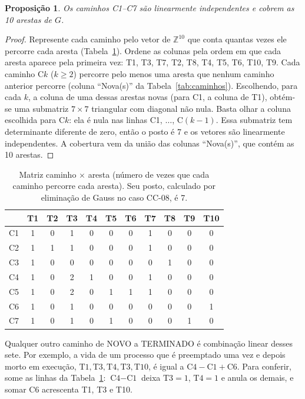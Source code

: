 \documentclass[11pt,a4paper]{article}
\newtheorem{proposicao}{Proposição}
\theoremstyle{definition}
\newcommand{\est}[1]{\textsf{\small #1}}   %
\begin{document}
\begin{proposicao}\label{prop:base}
Os caminhos C1--C7 são linearmente independentes e cobrem as 10 arestas de $G$.
\end{proposicao}
\begin{proof}
Represente cada caminho pelo vetor de $\mathbb{Z}^{10}$ que conta quantas vezes ele percorre cada
aresta (Tabela~\ref{tab:matriz-caminhos}). Ordene as colunas pela ordem em que cada aresta aparece
pela primeira vez: T1, T3, T7, T2, T8, T4, T5, T6, T10, T9. Cada caminho C$k$ ($k \ge 2$) percorre
pelo menos uma aresta que nenhum caminho anterior percorre (coluna ``Nova(s)'' da
Tabela~\ref{tab:caminhos}). Escolhendo, para cada $k$, a coluna de uma dessas arestas novas (para
C1, a coluna de T1), obtém-se uma submatriz $7 \times 7$ triangular com diagonal não nula. Basta
olhar a coluna escolhida para C$k$: ela é nula nas linhas C1, $\ldots$, C$(k-1)$. Essa submatriz
tem determinante diferente de zero, então o posto é 7 e os vetores são linearmente independentes.
A cobertura vem da união das colunas ``Nova(s)'', que contém as 10 arestas.
\end{proof}

\begin{table}[H]
\centering\small
\begin{tabular}{c*{10}{c}}
\toprule
 & T1 & T2 & T3 & T4 & T5 & T6 & T7 & T8 & T9 & T10 \\
\midrule
C1 & 1 & 0 & 1 & 0 & 0 & 0 & 1 & 0 & 0 & 0 \\
C2 & 1 & 1 & 1 & 0 & 0 & 0 & 1 & 0 & 0 & 0 \\
C3 & 1 & 0 & 0 & 0 & 0 & 0 & 0 & 1 & 0 & 0 \\
C4 & 1 & 0 & 2 & 1 & 0 & 0 & 1 & 0 & 0 & 0 \\
C5 & 1 & 0 & 2 & 0 & 1 & 1 & 1 & 0 & 0 & 0 \\
C6 & 1 & 0 & 1 & 0 & 0 & 0 & 0 & 0 & 0 & 1 \\
C7 & 1 & 0 & 1 & 0 & 1 & 0 & 0 & 0 & 1 & 0 \\
\bottomrule
\end{tabular}
\caption{Matriz caminho $\times$ aresta (número de vezes que cada caminho percorre cada aresta). Seu
posto, calculado por eliminação de Gauss no caso CC-08, é 7.}
\label{tab:matriz-caminhos}
\end{table}

Qualquer outro caminho de \est{NOVO} a \est{TERMINADO} é combinação linear desses sete. Por
exemplo, a vida de um processo que é preemptado uma vez e depois morto em execução,
$\text{T1},\text{T3},\text{T4},\text{T3},\text{T10}$, é igual a $\text{C4} - \text{C1} + \text{C6}$.
Para conferir, some as linhas da Tabela~\ref{tab:matriz-caminhos}: $\text{C4} - \text{C1}$ deixa
$\text{T3} = 1$, $\text{T4} = 1$ e anula os demais, e somar C6 acrescenta T1, T3 e T10.
\end{document}

